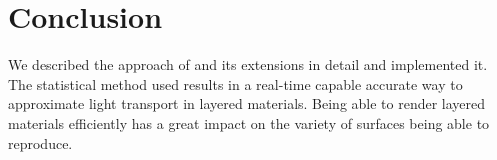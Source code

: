 \section{Conclusion}
\label{sec:conclusion}

We described the approach of \textcite{belcour2018} and its extensions \parencite{weier2020,yamaguchi2019} in detail and implemented it. The statistical method used results in a real-time capable accurate way to approximate light transport in layered materials. Being able to render layered materials efficiently has a great impact on the variety of surfaces being able to reproduce.